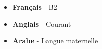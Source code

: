 \documentclass[9pt]{developercv} %
\begin{document}




\vspace{-20 pt}
\vspace{-6pt}

\begin{itemize}[noitemsep,topsep=0pt,parsep=0pt,partopsep=0pt, leftmargin=0.18\textwidth]
    \item \textbf{Français} - B2
    \item \textbf{Anglais} - Courant
    \item \textbf{Arabe} - Langue maternelle
\end{itemize}


\end{document}
